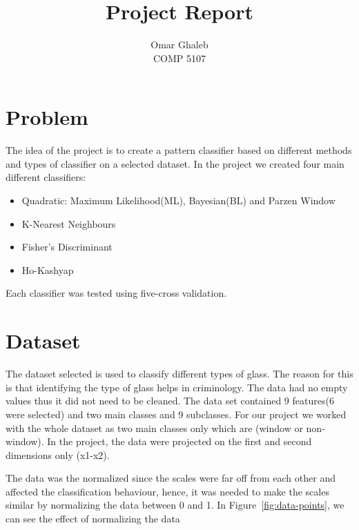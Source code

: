 \documentclass[11pt, oneside]{article}   	%
\title{Project Report}
\author{Omar Ghaleb\\
COMP 5107}
\date{}							%
\begin{document}
\renewcommand\thesubsection{\alph{subsection}.}
\maketitle
\section*{Problem}
The idea of the project is to create a pattern classifier based on different methods and types of classifier on a selected dataset. In the project we created four main different classifiers:
\begin{itemize}
	\item Quadratic: Maximum Likelihood(ML), Bayesian(BL) and Parzen Window
	\item K-Nearest Neighbours
	\item Fisher's Discriminant 
	\item Ho-Kashyap
\end{itemize}
Each classifier was tested using five-cross validation.

\section*{Dataset}
The dataset selected is used to classify different types of glass. The reason for this is that identifying the type of glass helps in criminology. The data had no empty values thus it did not need to be cleaned. The data set contained 9 features(6 were selected) and two main classes and 9 subclasses. For our project we worked with the whole dataset as two main classes only which are (window or non-window). In the project, the data were projected on the first and second dimensions only (x1-x2).

The data was the normalized since the scales were far off from each other and affected the classification behaviour, hence, it was needed to make the scales similar by normalizing the data between 0 and 1. In Figure~\ref{fig:data-points}, we can see the effect of normalizing the data
\end{document}
